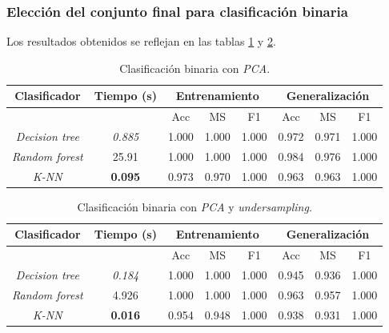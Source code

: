 \newpage
\subsubsection{Elección del conjunto final para clasificación binaria}
\label{subsubsec:eleccion_dataset_bin}

Los resultados obtenidos se reflejan en las tablas \ref{tabla:binary_pca} y \ref{tabla:binary_under}.

\begin{table}[th]
	\centering
	\begin{tabular}{ |c|c|c|c|c|c|c|c| }
		\hline
		\rowcolor{LightCyan}
		Clasificador & Tiempo (s) & \multicolumn{3}{c|}{Entrenamiento} & \multicolumn{3}{c|}{Generalización} \\
		\hline
		\rowcolor{LightCyan}
		&            & Acc & MS & F1 & Acc & MS & F1 \\
		\hline
		\textit{Decision tree}  & \textit{0.885} & 1.000 & 1.000 & 1.000 & 0.972 & 0.971 & 1.000 \\
		\textit{Random forest}  & 25.91 & 1.000 & 1.000 & 1.000 & 0.984 & 0.976 & 1.000 \\
		\textit{K-NN}           & \textbf{0.095} & 0.973 & 0.970 & 1.000 & 0.963 & 0.963 & 1.000 \\
		\hline
	\end{tabular}
	\caption{Clasificación binaria con \textit{PCA}.}
	\label{tabla:binary_pca}
\end{table}

\begin{table}[th]
	\centering
	\begin{tabular}{ |c|c|c|c|c|c|c|c| }
		\hline
		\rowcolor{LightCyan}
		Clasificador & Tiempo (s) & \multicolumn{3}{c|}{Entrenamiento} & \multicolumn{3}{c|}{Generalización} \\
		\hline
		\rowcolor{LightCyan}
		&            & Acc & MS & F1 & Acc & MS & F1 \\
		\hline
		\textit{Decision tree}  & \textit{0.184} & 1.000 & 1.000 & 1.000 & 0.945 & 0.936 & 1.000 \\
		\textit{Random forest}  & 4.926 & 1.000 & 1.000 & 1.000 & 0.963 & 0.957 & 1.000 \\
		\textit{K-NN}           & \textbf{0.016} & 0.954 & 0.948 & 1.000 & 0.938 & 0.931 & 1.000 \\
		\hline
	\end{tabular}
	\caption{Clasificación binaria con \textit{PCA} y \textit{undersampling}.}
	\label{tabla:binary_under}
\end{table}

